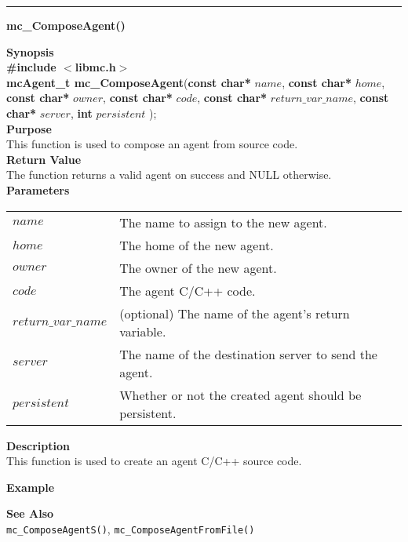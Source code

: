 \noindent
\vspace{5pt}
\rule{6.5in}{0.015in}
\noindent
{}
{\LARGE \bf mc\_ComposeAgent()}\\

\noindent
{\bf Synopsis}\\
{\bf \#include $<$libmc.h$>$}\\
{\bf mcAgent\_t mc\_ComposeAgent}({\bf const char*} $name$, 
                                  {\bf const char*} $home$,
                                  {\bf const char*} $owner$,
                                  {\bf const char*} $code$,
                                  {\bf const char*} $return\_var\_name$,
                                  {\bf const char*} $server$,
                                  {\bf int} $persistent$
																	);\\

\noindent
{\bf Purpose}\\
This function is used to compose an agent from source code.\\

\noindent
{\bf Return Value}\\
The function returns a valid agent on success and NULL otherwise.\\

\noindent
{\bf Parameters}
\vspace{-0.1in}
\begin{description}
\item
\begin{tabular}{p{30 mm}p{125 mm}} 
$name$ & The name to assign to the new agent.\\
$home$ & The home of the new agent.\\
$owner$ & The owner of the new agent.\\
$code$ & The agent C/C++ code.\\
$return\_var\_name$ & (optional) The name of the agent's return variable.\\
$server$ & The name of the destination server to send the agent.\\
$persistent$ & Whether or not the created agent should be persistent.\\
\end{tabular}
\end{description}

\noindent
{\bf Description}\\
This function is used to create an agent C/C++ source code. 

\noindent
{\bf Example}\\
\noindent
{\footnotesize}

\noindent
{\bf See Also}\\
\texttt{mc\_ComposeAgentS()}, \texttt{mc\_ComposeAgentFromFile()}

